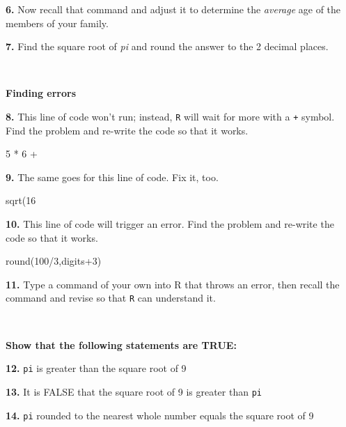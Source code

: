 \documentclass[
]{book}
\newenvironment{Shaded}{\begin{snugshade}}{\end{snugshade}}
\newcommand{\DecValTok}[1]{\textcolor[rgb]{0.00,0.00,0.81}{#1}}
\newcommand{\FunctionTok}[1]{\textcolor[rgb]{0.00,0.00,0.00}{#1}}
\newcommand{\NormalTok}[1]{#1}
\newcommand{\SpecialCharTok}[1]{\textcolor[rgb]{0.00,0.00,0.00}{#1}}
\begin{document}
\textbf{6.} Now recall that command and adjust it to determine the \emph{average} age of the members of your family.

\textbf{7.} Find the square root of \emph{pi} and round the answer to the 2 decimal places.

~

\textbf{Finding errors}

\textbf{8.} This line of code won't run; instead, \texttt{R} will wait for more with a \texttt{+} symbol. Find the problem and re-write the code so that it works.

\begin{Shaded}
\begin{Highlighting}[]
\DecValTok{5} \SpecialCharTok{*} \DecValTok{6} \SpecialCharTok{+}
\end{Highlighting}
\end{Shaded}

\textbf{9.} The same goes for this line of code. Fix it, too.

\begin{Shaded}
\begin{Highlighting}[]
\FunctionTok{sqrt}\NormalTok{(}\DecValTok{16}
\end{Highlighting}
\end{Shaded}

\textbf{10.} This line of code will trigger an error. Find the problem and re-write the code so that it works.

\begin{Shaded}
\begin{Highlighting}[]
\FunctionTok{round}\NormalTok{(}\DecValTok{100}\SpecialCharTok{/}\DecValTok{3}\NormalTok{,digits}\SpecialCharTok{+}\DecValTok{3}\NormalTok{)}
\end{Highlighting}
\end{Shaded}

\textbf{11.} Type a command of your own into R that throws an error, then recall the command and revise so that \texttt{R} can understand it.

~

\textbf{Show that the following statements are TRUE:}

\textbf{12.} \texttt{pi} is greater than the square root of 9

\textbf{13.} It is FALSE that the square root of 9 is greater than \texttt{pi}

\textbf{14.} \texttt{pi} rounded to the nearest whole number equals the square root of 9

~
\end{document}
